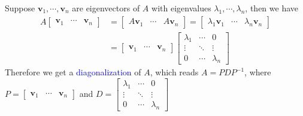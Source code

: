 \documentclass{beamer}
\theoremstyle{definition}
\theoremstyle{remark}
\begin{document}
\begin{frame}[t]
\begin{theorem}\label{09:52-07/07/2022}
Suppose $\mathbf v_1,\cdots,\mathbf v_n$ are eigenvectors of $A$ with eigenvalues $\lambda_1,\cdots,\lambda_n$, then we have\pause
\begin{align*}
A\begin{bmatrix}
\mathbf v_1& \cdots& \mathbf v_n
\end{bmatrix}&=\begin{bmatrix}
A\mathbf v_1& \cdots&A \mathbf v_n
\end{bmatrix}=\begin{bmatrix}
\lambda_1\mathbf v_1& \cdots&\lambda_n\mathbf v_n
\end{bmatrix}\\
&=\begin{bmatrix}
\mathbf v_1& \cdots& \mathbf v_n
\end{bmatrix}\begin{bmatrix}
\lambda_1&\cdots&0\\
\vdots&\ddots&\vdots\\
0&\cdots&\lambda_n
\end{bmatrix}
\end{align*}\pause
Therefore we get a \textcolor{blue}{diagonalization} of $A$, which reads $A=PDP^{-1}$, where $P=\begin{bmatrix}
\mathbf v_1& \cdots& \mathbf v_n
\end{bmatrix}$ and $D=\begin{bmatrix}
\lambda_1&\cdots&0\\
\vdots&\ddots&\vdots\\
0&\cdots&\lambda_n
\end{bmatrix}$
\end{theorem}
\end{frame}
\end{document}
